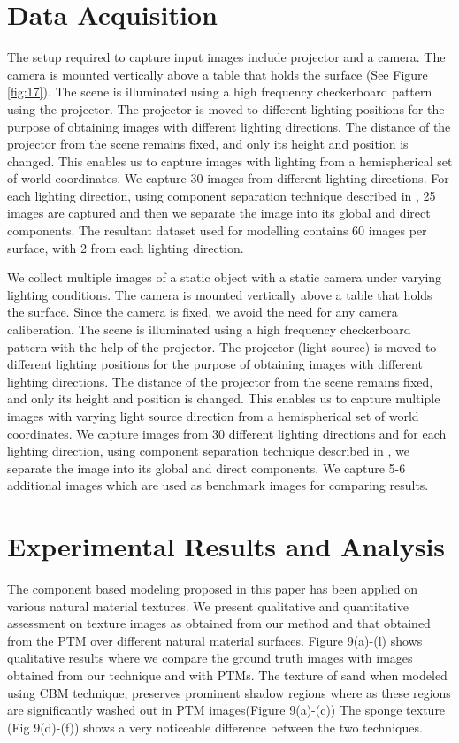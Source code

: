 \section{Data Acquisition}

The setup required to capture input images include projector and a camera. The
camera is mounted vertically above a table that holds the surface (See Figure \ref{fig:17}). The scene is
illuminated using a high frequency checkerboard pattern using the projector. The
projector is moved to different lighting positions for the purpose of obtaining
images with different lighting directions. The distance of the projector from
the scene remains fixed, and only its height and position is changed. This
enables us to capture images with lighting from a hemispherical set of world
coordinates. We capture 30 images from different lighting directions. For each
lighting direction, using component separation technique described in \cite{B4},
25 images are captured and then we separate the image into its global and direct components. The resultant
dataset used for modelling contains 60 images per surface, with 2 from each lighting direction.

We collect multiple images of a static object with a static camera under varying
lighting conditions. The
camera is mounted vertically above a table that holds the surface. Since the camera is fixed, we avoid the
need for any camera caliberation. 
The scene is illuminated using a high frequency checkerboard pattern with the help of the projector. The
projector (light source) is moved to different lighting positions for the purpose of obtaining
images with different lighting directions. 
The distance of the projector from
the scene remains fixed, and only its height and position is changed. This
enables us to capture multiple images with varying light source direction from a hemispherical set of world
coordinates. We capture images from 30 different lighting directions and for each
lighting direction, using component separation technique described in \cite{A9},
we separate the image into its global and direct components. We capture 5-6 additional images which are used as 
benchmark images for comparing results.  

\section{Experimental Results and Analysis}

The component based modeling proposed in this paper has been applied on various
natural material textures. We present qualitative and quantitative assessment on
texture images as obtained from our method and that obtained from the PTM over
different natural material surfaces. Figure 9(a)-(l) shows qualitative results where we compare the
ground truth images with images obtained from our technique and with PTMs. The
texture of sand when modeled using CBM technique, preserves prominent shadow
regions where as these regions are significantly washed out in PTM images(Figure
9(a)-(c)) The sponge texture (Fig 9(d)-(f)) shows a very noticeable difference
between the two techniques.

